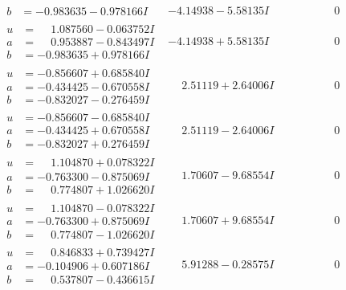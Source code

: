 \documentclass[1p]{elsarticle_modified}
\theoremstyle{definition}
\begin{document}
$$\begin{array}{c|c|c}
\begin{aligned}
b &= -0.983635 - 0.978166 I\end{aligned}
 & -4.14938 - 5.58135 I & \phantom{-0.000000 } 0 \\ \hline\begin{aligned}
u &= \phantom{-}1.087560 - 0.063752 I \\
a &= \phantom{-}0.953887 - 0.843497 I \\
b &= -0.983635 + 0.978166 I\end{aligned}
 & -4.14938 + 5.58135 I & \phantom{-0.000000 } 0 \\ \hline\begin{aligned}
u &= -0.856607 + 0.685840 I \\
a &= -0.434425 - 0.670558 I \\
b &= -0.832027 - 0.276459 I\end{aligned}
 & \phantom{-}2.51119 + 2.64006 I & \phantom{-0.000000 } 0 \\ \hline\begin{aligned}
u &= -0.856607 - 0.685840 I \\
a &= -0.434425 + 0.670558 I \\
b &= -0.832027 + 0.276459 I\end{aligned}
 & \phantom{-}2.51119 - 2.64006 I & \phantom{-0.000000 } 0 \\ \hline\begin{aligned}
u &= \phantom{-}1.104870 + 0.078322 I \\
a &= -0.763300 - 0.875069 I \\
b &= \phantom{-}0.774807 + 1.026620 I\end{aligned}
 & \phantom{-}1.70607 - 9.68554 I & \phantom{-0.000000 } 0 \\ \hline\begin{aligned}
u &= \phantom{-}1.104870 - 0.078322 I \\
a &= -0.763300 + 0.875069 I \\
b &= \phantom{-}0.774807 - 1.026620 I\end{aligned}
 & \phantom{-}1.70607 + 9.68554 I & \phantom{-0.000000 } 0 \\ \hline\begin{aligned}
u &= \phantom{-}0.846833 + 0.739427 I \\
a &= -0.104906 + 0.607186 I \\
b &= \phantom{-}0.537807 - 0.436615 I\end{aligned}
 & \phantom{-}5.91288 - 0.28575 I & \phantom{-0.000000 } 0 \\ \hline\begin{aligned}

\end{aligned}
\end{array}$$
\end{document}
